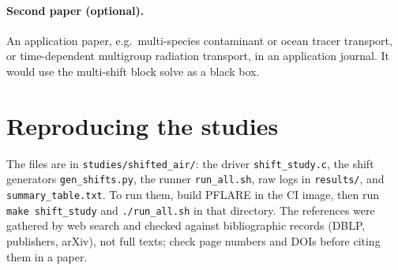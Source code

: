 \documentclass[11pt,a4paper]{article}
\begin{document}
\paragraph{Second paper (optional).} An application paper, e.g.\ multi-species contaminant or ocean tracer transport, or time-dependent multigroup radiation transport, in an application journal. It would use the multi-shift block solve as a black box.

\section*{Reproducing the studies}
The files are in \texttt{studies/shifted\_air/}: the driver \texttt{shift\_study.c}, the shift generators \texttt{gen\_shifts.py}, the runner \texttt{run\_all.sh}, raw logs in \texttt{results/}, and \texttt{summary\_table.txt}. To run them, build PFLARE in the CI image, then run \texttt{make shift\_study} and \texttt{./run\_all.sh} in that directory. The references were gathered by web search and checked against bibliographic records (DBLP, publishers, arXiv), not full texts; check page numbers and DOIs before citing them in a paper.
\end{document}
